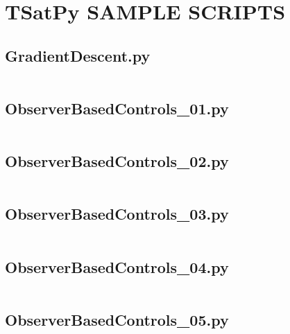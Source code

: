 
\chapter{TSatPy SAMPLE SCRIPTS}
\label{chap:tsatpy_samples}

\linespread{1}

\pagebreak
\section*{GradientDescent.py}\label{code:TSatPySamples/GradientDescent.py}\inputminted[linenos,fontsize=\scriptsize]{python}{/home/dcouture/git/mathyourlife/TSatPy/tex/sample_scripts/GradientDescent.py}

\pagebreak
\section*{ObserverBasedControls\_01.py}\label{code:TSatPySamples/ObserverBasedControls_01.py}\inputminted[linenos,fontsize=\scriptsize]{python}{/home/dcouture/git/mathyourlife/TSatPy/tex/sample_scripts/ObserverBasedControls_01.py}

\pagebreak
\section*{ObserverBasedControls\_02.py}\label{code:TSatPySamples/ObserverBasedControls_02.py}\inputminted[linenos,fontsize=\scriptsize]{python}{/home/dcouture/git/mathyourlife/TSatPy/tex/sample_scripts/ObserverBasedControls_02.py}

\pagebreak
\section*{ObserverBasedControls\_03.py}\label{code:TSatPySamples/ObserverBasedControls_03.py}\inputminted[linenos,fontsize=\scriptsize]{python}{/home/dcouture/git/mathyourlife/TSatPy/tex/sample_scripts/ObserverBasedControls_03.py}

\pagebreak
\section*{ObserverBasedControls\_04.py}\label{code:TSatPySamples/ObserverBasedControls_04.py}\inputminted[linenos,fontsize=\scriptsize]{python}{/home/dcouture/git/mathyourlife/TSatPy/tex/sample_scripts/ObserverBasedControls_04.py}

\pagebreak
\section*{ObserverBasedControls\_05.py}\label{code:TSatPySamples/ObserverBasedControls_05.py}\inputminted[linenos,fontsize=\scriptsize]{python}{/home/dcouture/git/mathyourlife/TSatPy/tex/sample_scripts/ObserverBasedControls_05.py}

